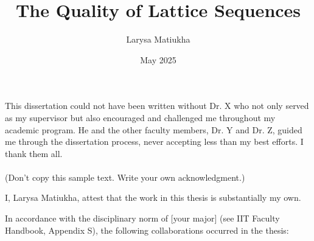 \documentclass{iitthesis-au} %
\begin{document}
\title{The Quality of Lattice Sequences}
\author{Larysa Matiukha}
\date{May 2025}
\copyrightnoticetrue      %
\maketitle                %


\prelimpages         %


\begin{acknowledgment}     %
\par  This dissertation could not have been written without Dr. X
who not only served as my supervisor but also encouraged and
challenged me throughout my academic program. He and the other
faculty members, Dr. Y and Dr. Z, guided me through the
dissertation process, never accepting less than my best efforts. I
thank them all.\\ \\ (Don't copy this sample text. Write your own
acknowledgment.)


\end{acknowledgment}

\begin{authorship}
	\par I, Larysa Matiukha, attest that the work in this thesis is substantially my own.	
	
	In accordance with the disciplinary norm of [your major] (see IIT Faculty Handbook, Appendix S), the following collaborations occurred in the thesis: 
	
	
\end{authorship}

\tableofcontents
\clearpage
\end{document}
